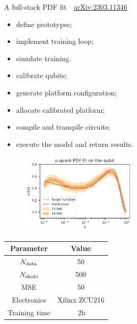 \documentclass[8pt, xcolor={svgnames}]{beamer}
\begin{document}
\begin{frame}{A full-stack PDF fit \hfill \faBook\,\, \href{https://arxiv.org/abs/2303.11346}{arXiv:2303.11346}}

\begin{multicols}{2}
\hspace{2cm}
\begin{tcolorbox}[title=High level API: Qibo, colback=blue!20]
\begin{itemize}[noitemsep]
\small
   \item[\faCode] define prototypes;
   \item[\faCode] implement training loop;
   \item[\faCode] simulate training.
\end{itemize}
\end{tcolorbox}
\begin{tcolorbox}[title=Calibration: Qibocal, colback=yellow!20]
\begin{itemize}[noitemsep]
\small
   \item[\faCrosshairs] calibrate qubits;
   \item[\faCrosshairs] generate platform configuration;
\end{itemize}
\end{tcolorbox}
\begin{tcolorbox}[title=Execution: Qibolab, colback=red!20]
\begin{itemize}[noitemsep]
\small
   \item[\faCog] allocate calibrated platform;
   \item[\faCog] compile and transpile circuits;
   \item[\faCog] execute the model and return results.
\end{itemize}
\end{tcolorbox}
\begin{figure}  
    \includegraphics[width=0.5\textwidth]{figures/qpdf.pdf}
\end{figure}

\begin{table}
\flushright
\begin{tabular}{cc}
\hline \hline 
\textbf{Parameter} & \textbf{Value} \\
\hline 
$N_{\rm data}$ & 50 \\
$N_{\rm shots}$ & 500 \\
MSE & 50 \\
Electronics & Xilinx ZCU216 \\
Training time & $~2$h \\
\hline \hline
\end{tabular}
\end{table}


\end{multicols}
\end{frame}
\end{document}
